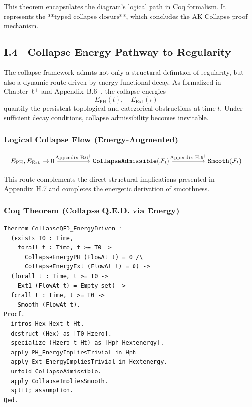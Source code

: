 \documentclass[11pt]{article}
\begin{document}
This theorem encapsulates the diagram's logical path in Coq formalism. It represents the **typed collapse closure**, which concludes the AK Collapse proof mechanism.

\subsection{I.4$^{+}$ Collapse Energy Pathway to Regularity}
\label{sec:collapse-energy-pathway}

The collapse framework admits not only a structural definition of regularity, but also a dynamic route driven by energy-functional decay. As formalized in Chapter~6$^{+}$ and Appendix~B.6$^{+}$, the collapse energies
\[
E_{\mathrm{PH}}(t), \quad E_{\mathrm{Ext}}(t)
\]
quantify the persistent topological and categorical obstructions at time \( t \). Under sufficient decay conditions, collapse admissibility becomes inevitable.

\subsubsection*{Logical Collapse Flow (Energy-Augmented)}

\[
\begin{tikzcd}[row sep=large, column sep=huge]
E_{\mathrm{PH}}, E_{\mathrm{Ext}} \to 0
\arrow[r, "\text{Appendix B.6\textsuperscript{+}}"]
& \texttt{CollapseAdmissible}(\mathcal{F}_t)
\arrow[r, "\text{Appendix H.6\textsuperscript{+}}"]
& \texttt{Smooth}(\mathcal{F}_t)
\end{tikzcd}
\]

This route complements the direct structural implications presented in Appendix~H.7 and completes the energetic derivation of smoothness.

\subsubsection*{Coq Theorem (Collapse Q.E.D. via Energy)}

\begin{lstlisting}[language=Coq, caption={Collapse Q.E.D. via Energy Decay}]
Theorem CollapseQED_EnergyDriven :
  (exists T0 : Time,
    forall t : Time, t >= T0 ->
      CollapseEnergyPH (FlowAt t) = 0 /\
      CollapseEnergyExt (FlowAt t) = 0) ->
  (forall t : Time, t >= T0 ->
    Ext1 (FlowAt t) = Empty_set) ->
  forall t : Time, t >= T0 ->
    Smooth (FlowAt t).
Proof.
  intros Hex Hext t Ht.
  destruct (Hex) as [T0 Hzero].
  specialize (Hzero t Ht) as [Hph Hextenergy].
  apply PH_EnergyImpliesTrivial in Hph.
  apply Ext_EnergyImpliesTrivial in Hextenergy.
  unfold CollapseAdmissible.
  apply CollapseImpliesSmooth.
  split; assumption.
Qed.
\end{lstlisting}
\end{document}

